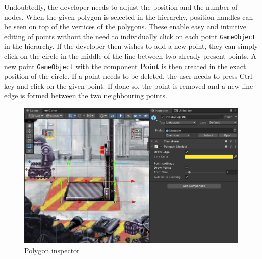 Undoubtedly, the developer needs to adjust the position and the number of nodes. When the given polygon is selected in the hierarchy, position handles can be seen on top of the vertices of the polygons. These enable easy and intuitive editing of points without the need to individually click on each point \verb|GameObject| in the hierarchy. If the developer then wishes to add a new point, they can simply click on the circle in the middle of the line between two already present points. A new point \verb|GameObject| with the component \textbf{Point} is then created in the exact position of the circle. If a point needs to be deleted, the user needs to press Ctrl key and click on the given point. If done so, the point is removed and a new line edge is formed between the two neighbouring points.
\begin{figure}[H]
\centering
\includegraphics[width=1\linewidth]{img/User doc/polygon.png}
\caption{Polygon inspector}
\label{fig:Manual-Polygon}
\end{figure}

